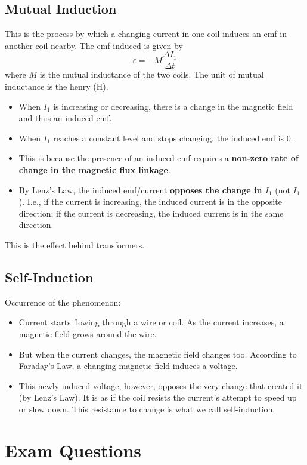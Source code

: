 \documentclass[a4paper,12pt]{article}
\let\oldsection\section
\renewcommand\section{\clearpage\oldsection}
\begin{document}
\subsection{Mutual Induction}

This is the process by which a changing current in one coil induces an emf in another coil nearby. The emf induced is given by $$\varepsilon = -M\frac{\Delta I_1}{\Delta t}$$where $M$ is the mutual inductance of the two coils. The unit of mutual inductance is the henry (H).
\begin{itemize}
  \item When $I_1$ is increasing or decreasing, there is a change in the magnetic field and thus an induced emf.
  \item When $I_1$ reaches a constant level and stops changing, the induced emf is 0.
  \item This is because the presence of an induced emf requires a \textbf{non-zero rate of change in the magnetic flux linkage}.
  \item By Lenz's Law, the induced emf/current \textbf{opposes the change in $I_1$} (not $I_1$). I.e., if the current is increasing, the induced current is in the opposite direction; if the current is decreasing, the induced current is in the same direction.
\end{itemize}
This is the effect behind transformers.

\subsection{Self-Induction}

Occurrence of the phenomenon:
\begin{itemize}
  \item Current starts flowing through a wire or coil.
        As the current increases, a magnetic field grows around the wire.
  \item But when the current changes, the magnetic field changes too. According to Faraday's Law, a changing magnetic field induces a voltage.
  \item This newly induced voltage, however, opposes the very change that created it (by Lenz's Law). It is as if the coil resists the current's attempt to speed up or slow down. This resistance to change is what we call self-induction.
\end{itemize}


\section{Exam Questions}
\end{document}
